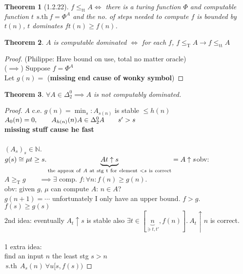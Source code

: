 \documentclass{article}
\let\ddd\cdots
\newcommand{\sth}{\ \mathrm{s.th}\ }
\newcommand{\N}{\mathbb{N}}
\newcommand{\tr}{\leq_\mathrm{T}}
\newtheorem{theorem}{Theorem}[section]
\theoremstyle{definition}
\theoremstyle{remark}
\theoremstyle{example}
\begin{document}
	\begin{theorem}[1.2.22]
		$f \leq_{\mathrm{tt}}A \iff$ there is a turing function $\Phi$ and computable function $t\ \sth f=\Phi^A$ and the no. of steps needed to compute $f$ is bounded by $t(n)$, $t$ dominates $f t(n) \geq f(n)$.
	\end{theorem}
	\begin{theorem}
		$A$ is computable dominated $\iff$ for each $f$, $f \tr A \to f \leq_{\mathrm{tt}} A$
	\end{theorem}
	\begin{proof}
		(Philippe: Have bound on use, total no matter oracle)\\
		($\implies$) Suppose $f = \Phi^A$\\
		Let $g(n)=$ (\textbf{missing end cause of wonky symbol})
	\end{proof}
	
	\begin{theorem}
		$\forall A \in \Delta_2^0 \implies A$ is not computably dominated.
	\end{theorem}
	\begin{proof}
		$A$ c.e. $g(n)=\min_s:A_{s(n)}$ is stable $\leq h(n)$\\
		$A_0(n)=0,\qquad A_{h(n)}(n)\\
		A \in \Delta_2^0 A\qquad s' > s$\\
		\textbf{missing stuff cause he fast}\\\\
		$(A_s)_s \in \N$.\\
		$g(s) \cong \mu t \geq s . \underbrace{A t \uparrow s}_{\mathrm{the\ approx\ of\ }A\mathrm{\ at\ stg\ t\ for\ element\ }<s\mathrm{\ is\ correct}} = A \uparrow s\\
		$obv: $A \geq_\mathrm{T}g\qquad \implies \exists$ comp. $f:\forall n : f(n) \geq g(n)$.\\
		obv: given $g$, $\mu$ can compute $A$: $n \in A$?\\
		$g(n+1)=\ddd$ unfortunately I only have an upper bound. $f > g$.\\
		
		$f(s) \geq g(s)$\\
		2nd idea: eventually $A_t \uparrow s$ is stable also $\exists t \in [\underbrace{n}_{\ni t, t'}, f(n)].\ A_t \uparrow n$ is correct.\\
		\\
		1 extra idea:\\
		find an input $n$ the least stg $s>n$\\
		$\sth\ A_s(n)\ \forall u[s,f(s))$		
	\end{proof}
\end{document}
